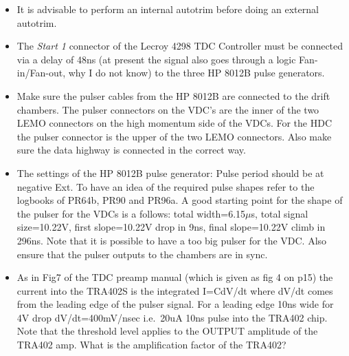 \documentclass[11pt]{report}
\begin{document}
\begin{itemize}

\item It is advisable to perform an internal autotrim before doing an 
external autotrim.

\item The {\it Start 1} connector of the Lecroy 4298 TDC Controller 
must be connected via a delay of 48ns (at present the signal also goes
through a logic Fan-in/Fan-out, why I do not know) to the three 
HP 8012B pulse generators.

\item Make sure the  pulser cables from the HP 8012B 
are connected to the drift chambers.
The pulser connectors on the VDC's are the inner of the two LEMO 
connectors on the high momentum side of the VDCs. For the HDC the pulser
connector is the upper of the two LEMO connectors.
Also make sure the data highway is connected in the correct way. 

\item The settings of the HP 8012B pulse generator:
Pulse period should be at negative Ext. To have an idea of the required
pulse shapes refer to the logbooks of PR64b, PR90 and PR96a.
A good starting point for the shape of the pulser for the VDCs is a follows: total width=6.15$\mu$s,
total signal size=10.22V, first slope=10.22V drop in 9ns, final slope=10.22V climb in 296ns.
Note that it is possible to have a too big pulser for the VDC.
Also ensure that the pulser outputs to the chambers are in sync.

\item As in Fig7 of the TDC preamp manual (which is given as fig 4 on p15)
the current into the TRA402S is the integrated I=CdV/dt where dV/dt comes from the
leading edge of the pulser signal.
For a leading edge 10ns wide for 4V drop dV/dt=400mV/nsec i.e.~20uA 10ns pulse into
the TRA402 chip. Note that the threshold level applies to the OUTPUT amplitude of the TRA402 amp.
What is the amplification factor of the TRA402?


\end{itemize}
\end{document}
